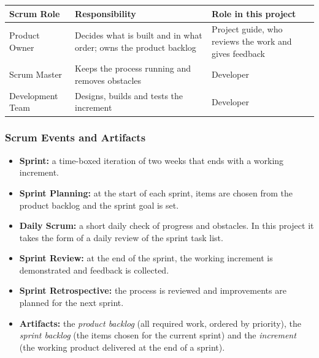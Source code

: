 \documentclass[12pt,a4paper]{article}
\begin{document}
\begin{table}[H]
\centering
\renewcommand{\arraystretch}{1.5}
\setlength{\tabcolsep}{6pt}

\begin{tabular}{|L{1.5in}|L{1.9in}|L{1.95in}|}
\hline
\textbf{Scrum Role} & \textbf{Responsibility} & \textbf{Role in this project} \\
\hline
Product Owner & Decides what is built and in what order; owns the product backlog & Project guide, who reviews the work and gives feedback \\
\hline
Scrum Master & Keeps the process running and removes obstacles & Developer \\
\hline
Development Team & Designs, builds and tests the increment & Developer \\
\hline
\end{tabular}
\end{table}

\subsubsection{Scrum Events and Artifacts}

\begin{spacing}{1.5}
\justifying
\begin{itemize}[leftmargin=*,itemsep=2pt]
  \item \textbf{Sprint:} a time-boxed iteration of two weeks that ends with a
        working increment.

  \item \textbf{Sprint Planning:} at the start of each sprint, items are chosen
        from the product backlog and the sprint goal is set.

  \item \textbf{Daily Scrum:} a short daily check of progress and obstacles.
        In this project it takes the form of a daily review of the sprint task
        list.

  \item \textbf{Sprint Review:} at the end of the sprint, the working
        increment is demonstrated and feedback is collected.

  \item \textbf{Sprint Retrospective:} the process is reviewed and improvements
        are planned for the next sprint.

  \item \textbf{Artifacts:} the \emph{product backlog} (all required work,
        ordered by priority), the \emph{sprint backlog} (the items chosen for
        the current sprint) and the \emph{increment} (the working product
        delivered at the end of a sprint).
\end{itemize}
\end{spacing}
\end{document}
